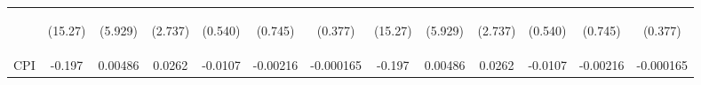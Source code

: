 \documentclass[]{article}
\begin{document}
\begin{center}
\begin{tabular}{lcccccccccccc}
\vspace{4pt} & \begin{footnotesize}(15.27)\end{footnotesize} & \begin{footnotesize}(5.929)\end{footnotesize} & \begin{footnotesize}(2.737)\end{footnotesize} & \begin{footnotesize}(0.540)\end{footnotesize} & \begin{footnotesize}(0.745)\end{footnotesize} & \begin{footnotesize}(0.377)\end{footnotesize} & \begin{footnotesize}(15.27)\end{footnotesize} & \begin{footnotesize}(5.929)\end{footnotesize} & \begin{footnotesize}(2.737)\end{footnotesize} & \begin{footnotesize}(0.540)\end{footnotesize} & \begin{footnotesize}(0.745)\end{footnotesize} & \begin{footnotesize}(0.377)\end{footnotesize} \\
CPI & -0.197 & 0.00486 & 0.0262 & -0.0107 & -0.00216 & -0.000165 & -0.197 & 0.00486 & 0.0262 & -0.0107 & -0.00216 & -0.000165 \\

\end{tabular}
\end{center}
\end{document}
